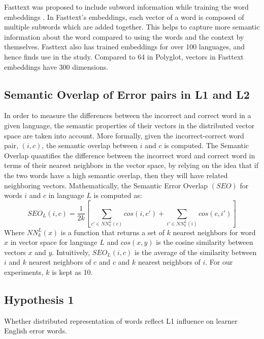 \documentclass[10pt,letterpaper]{article}
\begin{document}
Fasttext was proposed to include subword information while training the word embeddings \cite{bojanowskiEnrichingWordVectors2016}. In Fasttext's embeddings, each vector of a word is composed of multiple subwords which are added together. This helps to capture more semantic information about the word compared to using the words and the context by themselves. Fasttext also has trained embeddings for over 100 languages, and hence finds use in the study. Compared to 64 in Polyglot, vectors in Fasttext embeddings have 300 dimensions. 


\subsection{Semantic Overlap of Error pairs in L1 and L2}

In order to measure the differences between the incorrect and correct word in a given language, the semantic properties of their vectors in the distributed vector space are taken into account. More formally, given the incorrect-correct word pair, $(i, c)$, the semantic overlap between $i$ and $c$ is computed. The Semantic Overlap quantifies the difference between the incorrect word and correct word in terms of their nearest neighbors in the vector space, by relying on the idea that if the two words have a high semantic overlap, then they will have related neighboring vectors. Mathematically, the Semantic Error Overlap $(SEO)$ for words $i$ and $c$ in language $L$ is computed as:
\begin{equation} \label{seo}
SEO_{L}(i, c) = \frac{1}{2k}[\sum_{c'\in NN^L_k(c)}cos(i, c') + \sum_{i'\in NN^L_k(i)}cos(c, i')]
\end{equation}
Where $NN^L_k(x)$ is a function that returns a set of $k$ nearest neighbors for word $x$ in vector space for language $L$ and $cos(x, y)$ is the cosine similarity between vectors $x$ and $y$. Intuitively, $SEO_L(i, c)$ is the average of the similarity between $i$ and $k$ nearest neighbors of $c$ and $c$ and $k$ nearest neighbors of $i$. For our experiments, $k$ is kept as 10.
\subsection{Hypothesis 1}

Whether distributed representation of words reflect L1 influence on learner English error words.
\end{document}

